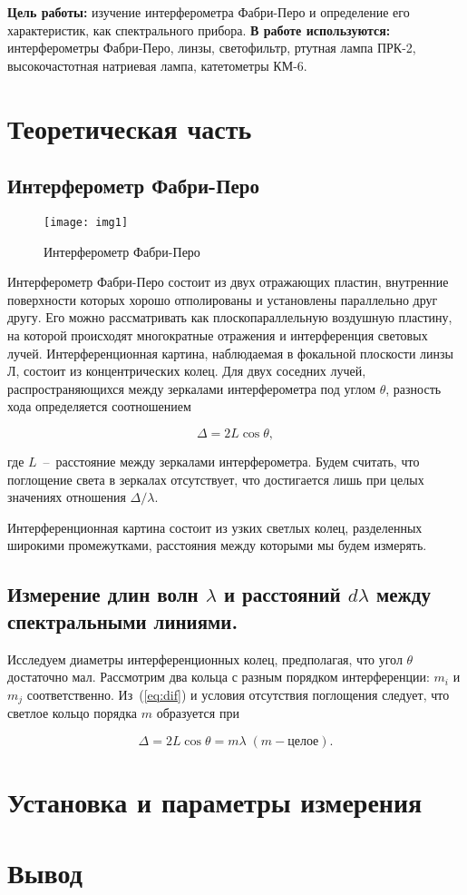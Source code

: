 \documentclass{letask}
\begin{document}


\textbf{Цель работы:}
изучение интерферометра Фабри-Перо и определение его характеристик, как спектрального прибора.
\textbf{В работе используются:} интерферометры Фабри-Перо, линзы, светофильтр, ртутная лампа ПРК-2, высокочастотная натриевая лампа, катетометры КМ-6.



\section{Теоретическая часть}

\subsection*{Интерферометр Фабри-Перо}

\begin{wrapfigure}[10]{r}{8 cm}
\texttt{[image: img1]}
\caption{Интерферометр Фабри-Перо}
\end{wrapfigure}

Интерферометр Фабри-Перо состоит из двух отражающих пластин, внутренние поверхности которых хорошо отполированы и установлены параллельно друг другу. Его можно рассматривать как плоскопараллельную воздушную пластину, на которой происходят многократные отражения и интерференция световых лучей. Интерференционная картина, наблюдаемая в фокальной плоскости линзы Л, состоит из концентрических колец. 
Для двух соседних лучей, распространяющихся между зеркалами интерферометра под углом $\theta$, разность хода определяется соотношением
 
\begin{equation}
\Delta = 2 L \cos \theta,
\label{eq:dif}
\end{equation}

где $L$~--~расстояние между зеркалами интерферометра.
Будем считать, что поглощение света в зеркалах отсутствует, что достигается лишь при целых значениях отношения $\Delta / \lambda$.

Интерференционная картина состоит из узких светлых колец, разделенных широкими промежутками, расстояния между которыми мы будем измерять.

\subsection*{Измерение длин волн $\lambda$ и расстояний $d \lambda$ между спектральными линиями.}

Исследуем диаметры интерференционных колец, предполагая, что угол $\theta$ достаточно мал.
Рассмотрим два кольца с разным порядком интерференции: $m_i$ и $m_j$ соответственно. 
Из~(\ref{eq:dif}) и условия отсутствия поглощения следует, что светлое кольцо порядка $m$ образуется при 

\begin{equation}
\Delta = 2 L \cos \theta = m \lambda \; (m - \text{целое}).
\end{equation}


\section{Установка и параметры измерения}



\section{Вывод}
\end{document}
